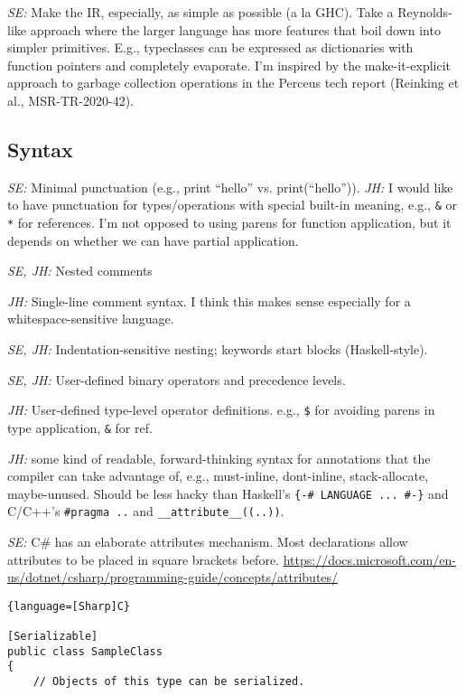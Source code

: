 \documentclass{article}
\begin{document}
\textit{SE:} Make the IR, especially, as simple as possible (a la
GHC). Take a Reynolds-like approach where the larger language has more
features that boil down into simpler primitives.  E.g., typeclasses
can be expressed as dictionaries with function pointers and completely
evaporate.  I'm inspired by the make-it-explicit approach to garbage
collection operations in the Perceus tech report (Reinking et al.,
MSR-TR-2020-42).

\subsection{Syntax}

\textit{SE:} Minimal punctuation (e.g., print ``hello'' vs. print(``hello'')).
\textit{JH:} I would like to have punctuation for types/operations with special
built-in meaning, e.g., \verb|&| or \verb|*| for references. I'm not opposed to
using parens for function application, but it depends on whether we can have
partial application.

\textit{SE, JH:} Nested comments

\textit{JH:} Single-line comment syntax. I think this makes sense especially for
a whitespace-sensitive language.

\textit{SE, JH:} Indentation-sensitive nesting; keywords start blocks (Haskell-style).

\textit{SE, JH:} User-defined binary operators and precedence levels.

\textit{JH:} User-defined type-level operator definitions. e.g., \verb|$| for
avoiding parens in type application, \verb|&| for ref.

\textit{JH:} some kind of readable, forward-thinking syntax for annotations that
the compiler can take advantage of, e.g., must-inline, dont-inline,
stack-allocate, maybe-unused. Should be less hacky than Haskell's
\verb|{-# LANGUAGE ... #-}| and C/C++'s \verb|#pragma ..| and
\verb|__attribute__((..))|.

\textit{SE:} C\# has an elaborate attributes mechanism.
Most declarations allow attributes to be placed in square brackets before.  \url{https://docs.microsoft.com/en-us/dotnet/csharp/programming-guide/concepts/attributes/}

\begin{lstlisting}{language=[Sharp]C}
 
[Serializable]
public class SampleClass
{
    // Objects of this type can be serialized.
 
\end{lstlisting}
\end{document}
